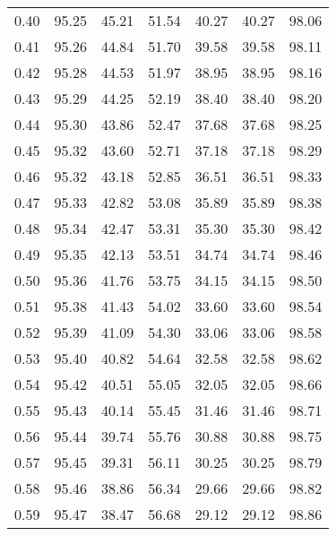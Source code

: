 \begin{tabular}{|c|c|c|c|c|c|c|}
      0.40 &     95.25 &     45.21 &      51.54 &   40.27 &      40.27 &         98.06 \\
      0.41 &     95.26 &     44.84 &      51.70 &   39.58 &      39.58 &         98.11 \\
      0.42 &     95.28 &     44.53 &      51.97 &   38.95 &      38.95 &         98.16 \\
      0.43 &     95.29 &     44.25 &      52.19 &   38.40 &      38.40 &         98.20 \\
      0.44 &     95.30 &     43.86 &      52.47 &   37.68 &      37.68 &         98.25 \\
      0.45 &     95.32 &     43.60 &      52.71 &   37.18 &      37.18 &         98.29 \\
      0.46 &     95.32 &     43.18 &      52.85 &   36.51 &      36.51 &         98.33 \\
      0.47 &     95.33 &     42.82 &      53.08 &   35.89 &      35.89 &         98.38 \\
      0.48 &     95.34 &     42.47 &      53.31 &   35.30 &      35.30 &         98.42 \\
      0.49 &     95.35 &     42.13 &      53.51 &   34.74 &      34.74 &         98.46 \\
      0.50 &     95.36 &     41.76 &      53.75 &   34.15 &      34.15 &         98.50 \\
      0.51 &     95.38 &     41.43 &      54.02 &   33.60 &      33.60 &         98.54 \\
      0.52 &     95.39 &     41.09 &      54.30 &   33.06 &      33.06 &         98.58 \\
      0.53 &     95.40 &     40.82 &      54.64 &   32.58 &      32.58 &         98.62 \\
      0.54 &     95.42 &     40.51 &      55.05 &   32.05 &      32.05 &         98.66 \\
      0.55 &     95.43 &     40.14 &      55.45 &   31.46 &      31.46 &         98.71 \\
      0.56 &     95.44 &     39.74 &      55.76 &   30.88 &      30.88 &         98.75 \\
      0.57 &     95.45 &     39.31 &      56.11 &   30.25 &      30.25 &         98.79 \\
      0.58 &     95.46 &     38.86 &      56.34 &   29.66 &      29.66 &         98.82 \\
      0.59 &     95.47 &     38.47 &      56.68 &   29.12 &      29.12 &         98.86 \\

\end{tabular}
